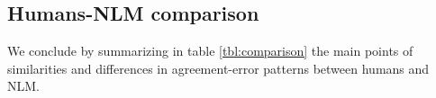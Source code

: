 \subsection{Humans-NLM comparison}
We conclude by summarizing in table \ref{tbl:comparison} the main points of similarities and differences in agreement-error patterns between humans and NLM.





